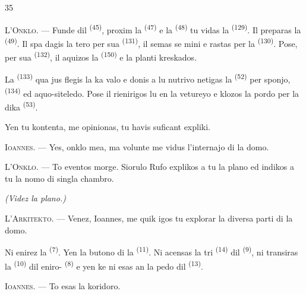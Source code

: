 \begin{VUpage}[37]{35}
\VUsaut{3.0mm}

\VUblancAlinea
\textsc{L'Onklo}. --- Funde dil  \textsuperscript{(45)}, proxim la\nl
{} \textsuperscript{(47)} e la  \textsuperscript{(48)} tu vidas la \cc
{} \textsuperscript{(129)}. Il preparas la  \textsuperscript{(49)}. Il spa\cc
dagis la tero per sua  \textsuperscript{(131)}, il semas se\cc
mini e rastas per la  \textsuperscript{(130)}. Pose, per sua\nl
{} \textsuperscript{(132)}, il aquizos la  \textsuperscript{(150)} e la planti\nl
kreskados.

\VUblancAlinea
La  \textsuperscript{(133)} qua jus flegis la ka\cc
valo e donis a lu nutrivo netigas la  \textsuperscript{(52)}\nl
per sponjo,  \textsuperscript{(134)} ed aquo-siteledo.\nl
Pose il rienirigos lu en la vetureyo e klozos la\nl
pordo per la dika  \textsuperscript{(53)}.

\VUblancAlinea
Yen tu kontenta, me opinionas, tu havis\nl
suficant expliki.

\VUblancAlinea
\textsc{Ioannes}. --- Yes, onklo mea, ma volunte me\nl
vidus l'internajo di la domo.

\VUblancAlinea
\textsc{L'Onklo}. --- To eventos morge. Siorulo\nl
Rufo explikos a tu la plano ed indikos a tu\nl
la nomo di singla chambro.

\VUsaut{3.0mm}
\VUsaut{2.4mm}

{\centering\textit{(Videz la plano.)}\par}
\VUsaut{2.4mm}

\VUblancAlinea
\textsc{L'Arkitekto}. --- Venez, Ioannes, me quik\nl
igos tu explorar la diversa parti di la domo.

\VUblancAlinea
Ni enirez la  \textsuperscript{(7)}. Yen la butono di\nl
la  \textsuperscript{(11)}. Ni acensas la tri  \textsuperscript{(14)} dil\nl
{} \textsuperscript{(9)}, ni transiras la  \textsuperscript{(10)} dil eniro-\nl
{} \textsuperscript{(8)} e yen ke ni esas an la pedo dil \cc
{} \textsuperscript{(13)}.

\VUblancAlinea
\textsc{Ioannes}. --- To esas la koridoro.
\end{VUpage}


